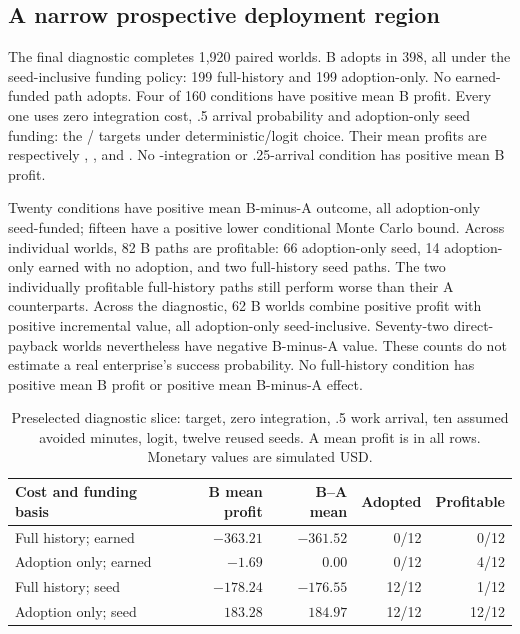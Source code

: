 \subsection{A narrow prospective deployment region}
The final diagnostic completes 1,920 paired worlds. B adopts in 398, all under the seed-inclusive funding policy:
199 full-history and 199 adoption-only. No earned-funded path adopts.
Four of 160 conditions have positive mean B profit. Every one uses zero integration cost,
.5 arrival probability and adoption-only seed funding: the / targets under
deterministic/logit choice. Their mean profits are respectively ,
,  and . No -integration or .25-arrival
condition has positive mean B profit.

Twenty conditions have positive mean B-minus-A outcome, all adoption-only seed-funded;
fifteen have a positive lower conditional Monte Carlo bound. Across individual worlds, 82 B paths
are profitable: 66 adoption-only seed, 14 adoption-only earned with no adoption, and two
full-history seed paths. The two individually profitable full-history paths still perform worse
than their A counterparts. Across the diagnostic, 62 B worlds combine positive profit with positive incremental value,
all adoption-only seed-inclusive. Seventy-two direct-payback worlds nevertheless have negative
B-minus-A value. These counts do not estimate a real enterprise's success probability. No full-history condition has positive mean B profit or positive mean B-minus-A effect.

\begin{table}[H]
\centering\small
\caption{Preselected diagnostic slice:  target, zero integration, .5 work arrival,
ten assumed avoided minutes, logit, twelve reused seeds. A mean profit is 
in all rows. Monetary values are simulated USD.}
\begin{tabularx}{\textwidth}{Yrrrr}
\toprule
Cost and funding basis & B mean profit & B--A mean & Adopted & Profitable\\
\midrule
Full history; earned & $-363.21$ & $-361.52$ & 0/12 & 0/12\\
Adoption only; earned & $-1.69$ & $0.00$ & 0/12 & 4/12\\
Full history; seed & $-178.24$ & $-176.55$ & 12/12 & 1/12\\
Adoption only; seed & $183.28$ & $184.97$ & 12/12 & 12/12\\
\bottomrule
\end{tabularx}
\end{table}


